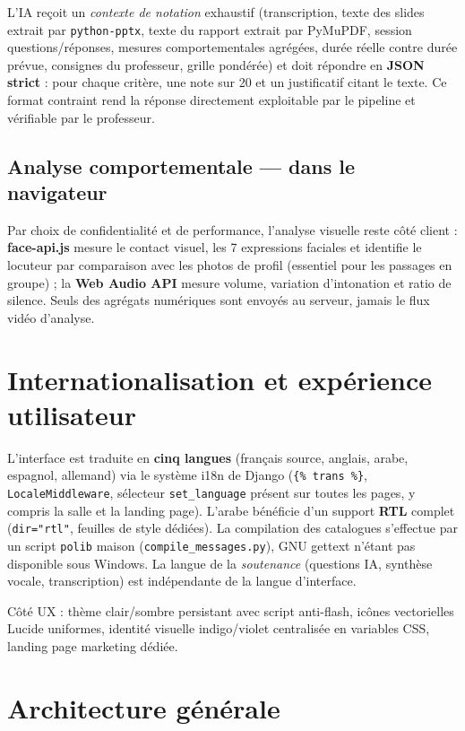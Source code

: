 \documentclass[12pt,a4paper]{report}
\begin{document}
L'IA reçoit un \emph{contexte de notation} exhaustif (transcription, texte des
slides extrait par \texttt{python-pptx}, texte du rapport extrait par PyMuPDF,
session questions/réponses, mesures comportementales agrégées, durée réelle
contre durée prévue, consignes du professeur, grille pondérée) et doit
répondre en \textbf{JSON strict} : pour chaque critère, une note sur 20 et un
justificatif citant le texte. Ce format contraint rend la réponse directement
exploitable par le pipeline et vérifiable par le professeur.

\subsection{Analyse comportementale --- dans le navigateur}
Par choix de confidentialité et de performance, l'analyse visuelle reste
côté client : \textbf{face-api.js} mesure le contact visuel, les 7 expressions
faciales et identifie le locuteur par comparaison avec les photos de profil
(essentiel pour les passages en groupe) ; la \textbf{Web Audio API} mesure
volume, variation d'intonation et ratio de silence. Seuls des agrégats
numériques sont envoyés au serveur, jamais le flux vidéo d'analyse.

\section{Internationalisation et expérience utilisateur}

L'interface est traduite en \textbf{cinq langues} (français source, anglais,
arabe, espagnol, allemand) via le système i18n de Django (\texttt{\{\% trans
\%\}}, \texttt{LocaleMiddleware}, sélecteur \texttt{set\_language} présent sur
toutes les pages, y compris la salle et la landing page). L'arabe bénéficie
d'un support \textbf{RTL} complet (\texttt{dir="rtl"}, feuilles de style
dédiées). La compilation des catalogues s'effectue par un script
\texttt{polib} maison (\texttt{compile\_messages.py}), GNU gettext n'étant pas
disponible sous Windows. La langue de la \emph{soutenance} (questions IA,
synthèse vocale, transcription) est indépendante de la langue d'interface.

Côté UX : thème clair/sombre persistant avec script anti-flash, icônes
vectorielles Lucide uniformes, identité visuelle indigo/violet centralisée en
variables CSS, landing page marketing dédiée.

\section{Architecture générale}
\end{document}
